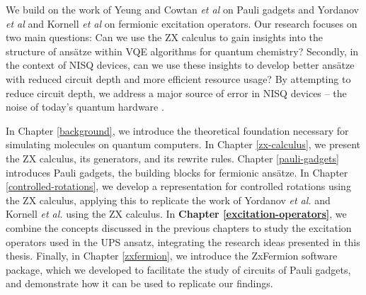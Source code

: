 We build on the work of Yeung \cite{Yeung2020} and Cowtan \textit{et al} \cite{Cowtan2020} on Pauli gadgets and Yordanov \textit{et al} \cite{Yordanov2020} and Kornell \textit{et al} \cite{Kornell2023} on fermionic excitation operators. Our research focuses on two main questions: Can we use the ZX calculus to gain insights into the structure of ansätze within VQE algorithms for quantum chemistry? Secondly, in the context of NISQ devices, can we use these insights to develop better ansätze with reduced circuit depth and more efficient resource usage? By attempting to reduce circuit depth, we address a major source of error in NISQ devices -- the noise of today's quantum hardware \cite{Cowtan2020}.

In Chapter \ref{background}, we introduce the theoretical foundation necessary for simulating molecules on quantum computers. In Chapter \ref{zx-calculus}, we present the ZX calculus, its generators, and its rewrite rules. Chapter \ref{pauli-gadgets} introduces Pauli gadgets, the building blocks for fermionic ansätze. In Chapter \ref{controlled-rotations}, we develop a representation for controlled rotations using the ZX calculus, applying this to replicate the work of Yordanov \textit{et al.} \cite{Yordanov2020} and Kornell \textit{et al.} \cite{Kornell2023} using the ZX calculus. In \textbf{Chapter \ref{excitation-operators}}, we combine the concepts discussed in the previous chapters to study the excitation operators used in the UPS ansatz, integrating the research ideas presented in this thesis. Finally, in Chapter \ref{zxfermion}, we introduce the ZxFermion software package, which we developed to facilitate the study of circuits of Pauli gadgets, and demonstrate how it can be used to replicate our findings.
